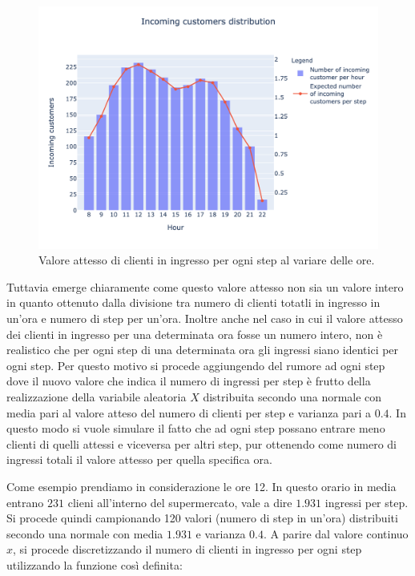 \begin{figure}[H]
	\centering
	\includegraphics[width=14cm]{"images/per_step_distribution.png"}
	\caption{Valore attesso di clienti in ingresso per ogni step al variare delle ore.}
	\label{fig:per_step_distribution}
\end{figure}

Tuttavia emerge chiaramente come questo valore attesso non sia un valore intero in quanto ottenuto dalla divisione tra numero di clienti totatli in ingresso in un'ora e numero di step per un'ora. Inoltre anche nel caso in cui il valore attesso dei clienti in ingresso per una determinata ora fosse un numero intero, non è realistico che per ogni step di una determinata ora gli ingressi siano identici per ogni step. Per questo motivo si procede aggiungendo del rumore ad ogni step dove il nuovo valore che indica il numero di ingressi per step è frutto della realizzazione della variabile aleatoria $X$ distribuita secondo una normale con media pari al valore atteso del numero di clienti per step e varianza pari a $0.4$. In questo modo si vuole simulare il fatto che ad ogni step possano entrare meno clienti di quelli attessi e viceversa per altri step, pur ottenendo come numero di ingressi totali il valore attesso per quella specifica ora.

Come esempio prendiamo in considerazione le ore 12. In questo orario in media entrano $231$ clieni all'interno del supermercato, vale a dire $1.931$ ingressi per step. Si procede quindi campionando 120 valori (numero di step in un'ora) distribuiti secondo una normale con media $1.931$ e varianza $0.4$. A parire dal valore continuo $x$, si procede discretizzando il numero di clienti in ingresso per ogni step utilizzando la funzione così definita:


